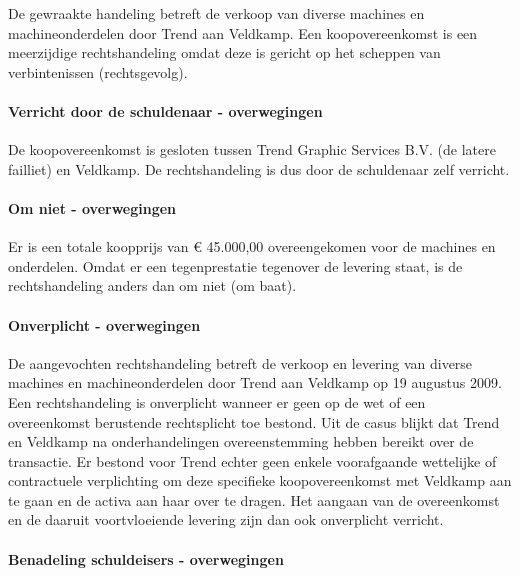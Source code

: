 \documentclass[
  dutch,
  a4paper,
]{article}
\begin{document}
De gewraakte handeling betreft de verkoop van diverse machines en machineonderdelen door Trend aan Veldkamp. Een koopovereenkomst is een meerzijdige rechtshandeling omdat deze is gericht op het scheppen van verbintenissen (rechtsgevolg).

\paragraph{Verricht door de schuldenaar - overwegingen}\label{verricht-door-de-schuldenaar---overwegingen-65}

De koopovereenkomst is gesloten tussen Trend Graphic Services B.V. (de latere failliet) en Veldkamp. De rechtshandeling is dus door de schuldenaar zelf verricht.

\paragraph{Om niet - overwegingen}\label{om-niet---overwegingen-65}

Er is een totale koopprijs van € 45.000,00 overeengekomen voor de machines en onderdelen. Omdat er een tegenprestatie tegenover de levering staat, is de rechtshandeling anders dan om niet (om baat).

\paragraph{Onverplicht - overwegingen}\label{onverplicht---overwegingen-65}

De aangevochten rechtshandeling betreft de verkoop en levering van diverse machines en machineonderdelen door Trend aan Veldkamp op 19 augustus 2009. Een rechtshandeling is onverplicht wanneer er geen op de wet of een overeenkomst berustende rechtsplicht toe bestond. Uit de casus blijkt dat Trend en Veldkamp na onderhandelingen overeenstemming hebben bereikt over de transactie. Er bestond voor Trend echter geen enkele voorafgaande wettelijke of contractuele verplichting om deze specifieke koopovereenkomst met Veldkamp aan te gaan en de activa aan haar over te dragen. Het aangaan van de overeenkomst en de daaruit voortvloeiende levering zijn dan ook onverplicht verricht.

\paragraph{Benadeling schuldeisers - overwegingen}\label{benadeling-schuldeisers---overwegingen-65}
\end{document}

